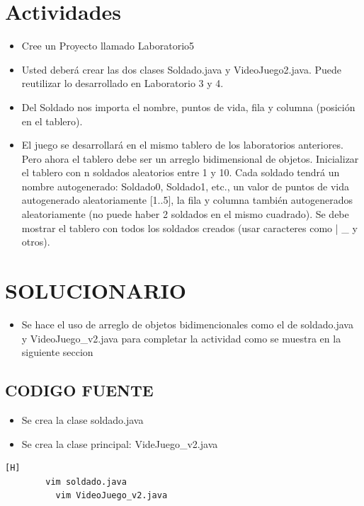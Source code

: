 \documentclass{article}
\begin{document}
	\section{Actividades}
	\begin{itemize}		
		\item Cree un Proyecto llamado Laboratorio5
\item Usted deberá crear las dos clases Soldado.java y VideoJuego2.java. Puede reutilizar lo
desarrollado en Laboratorio 3 y 4.
		\item Del Soldado nos importa el nombre, puntos de vida, fila y columna (posición en el tablero).
		\item El juego se desarrollará en el mismo tablero de los laboratorios anteriores. Pero ahora el
tablero debe ser un arreglo bidimensional de objetos.
\itm Inicializar el tablero con n soldados aleatorios entre 1 y 10. Cada soldado tendrá un nombre
autogenerado: Soldado0, Soldado1, etc., un valor de puntos de vida autogenerado
aleatoriamente [1..5], la fila y columna también autogenerados aleatoriamente (no puede
haber 2 soldados en el mismo cuadrado). Se debe mostrar el tablero con todos los soldados
creados (usar caracteres como | _ y otros).

	
	\end{itemize}
		
	\section{SOLUCIONARIO}
	\begin{itemize}
		\item Se hace el uso de arreglo de objetos bidimencionales  como el de soldado.java y VideoJuego_v2.java para completar la actividad como se muestra en la siguiente seccion
	\end{itemize}

	\subsection{CODIGO FUENTE}
	\begin{itemize}	
		\item Se crea la clase soldado.java
		\item Se crea la clase principal:   VideJuego_v2.java
	\end{itemize}	
		
	\begin{lstlisting}[language=bash,caption={Creando la clase Nave}][H]
		vim soldado.java
		  vim VideoJuego_v2.java
	\end{lstlisting}
	
\end{document}
